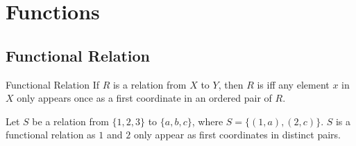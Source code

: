 \documentclass[\main/notes.tex]{subfiles}
\begin{document}
		\section{Functions}
			\subsection{Functional Relation}
				\begin{definition}{Functional Relation}
					If $R$ is a relation from $X$ to $Y$, then $R$ is  iff any element $x$ in $X$ only appears once as a first coordinate in an ordered pair of $R$.
				\end{definition}
				\begin{example}
					Let $S$ be a relation from $\{1, 2, 3\}$ to $\{a, b, c\}$, where $S = \bigl\{(1, a), (2, c)\bigr\}$. $S$ is a functional relation as $1$ and $2$ only appear as first coordinates in distinct pairs.
				\end{example}
\end{document}

